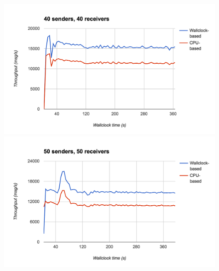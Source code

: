 \begin{figure}
  \centering\includegraphics[width=\textwidth]{../transcripts/lipsum/40n40/40n40.png}

  \centering\includegraphics[width=\textwidth]{../transcripts/lipsum/50n50/50n50.png}
\end{figure}
